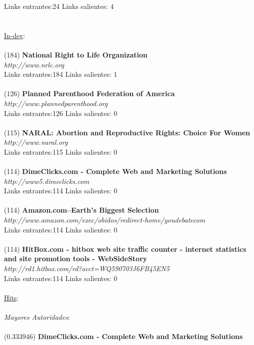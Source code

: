 \documentclass[a4paper]{article}
\begin{document}
Links entrantes:24 \indent Links salientes: 4\\
\\
\\
\underline{In-deg}:\\
\\
(184) \textbf{National Right to Life Organization} \\
\textit{http://www.nrlc.org} \\
Links entrantes:184 \indent Links salientes: 1\\
\\
(126) \textbf{Planned Parenthood Federation of America} \\
\textit{http://www.plannedparenthood.org} \\
Links entrantes:126 \indent Links salientes: 0\\
\\
(115) \textbf{NARAL: Abortion and Reproductive Rights: Choice For Women} \\
\textit{http://www.naral.org }\\
Links entrantes:115 \indent Links salientes: 0\\
\\
(114) \textbf{DimeClicks.com - Complete Web and Marketing Solutions} \\
\textit{http://www5.dimeclicks.com }\\
Links entrantes:114 \indent Links salientes: 0\\
\\
(114)\textbf{ Amazon.com--Earth's Biggest Selection }\\
\textit{http://www.amazon.com/exec/obidos/redirect-home/youdebatecom} \\
Links entrantes:114 \indent Links salientes: 0\\
\\
(114) \textbf{HitBox.com - hitbox web site traffic counter - internet statistics and site promotion tools - WebSideStory} \\
\textit{http://rd1.hitbox.com/rd?acct=WQ590703J6FB45EN5} \\
Links entrantes:114 \indent Links salientes: 0\\
\\
\underline{Hits}: \\
\\
\emph{Mayores Autoridades}: \\
\\
(0.333946) \textbf{DimeClicks.com - Complete Web and Marketing Solutions} \\
\end{document}
